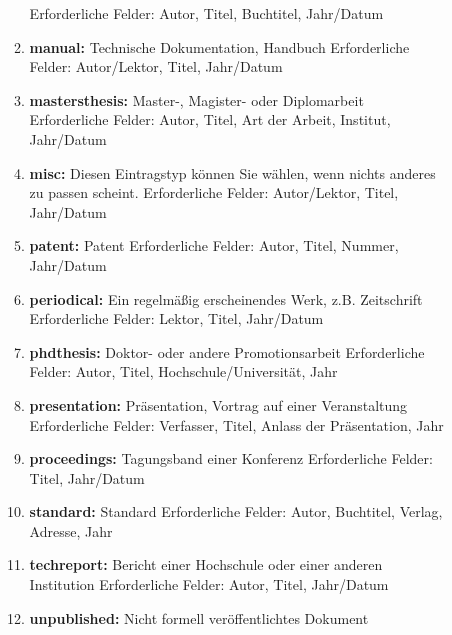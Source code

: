 \begin{description}
\begin{enumerate}
\begin{enumerate}
        Erforderliche Felder: Autor, Titel, Buchtitel, Jahr/Datum
        \item \textbf{manual:} Technische Dokumentation, Handbuch\newline
        Erforderliche Felder: Autor/Lektor, Titel, Jahr/Datum
        \item \textbf{mastersthesis:} Master-, Magister- oder Diplomarbeit\newline
        Erforderliche Felder: Autor, Titel, Art der Arbeit, Institut, Jahr/Datum
        \item \textbf{misc:} Diesen Eintragstyp können Sie wählen, wenn nichts anderes zu passen scheint. \newline
        Erforderliche Felder: Autor/Lektor, Titel, Jahr/Datum
        \item \textbf{patent:} Patent\newline 
        Erforderliche Felder: Autor, Titel, Nummer, Jahr/Datum
        \item \textbf{periodical:} Ein regelmäßig erscheinendes Werk, z.B. Zeitschrift\newline
        Erforderliche Felder: Lektor, Titel, Jahr/Datum
        \item \textbf{phdthesis:} Doktor- oder andere Promotionsarbeit\newline 
        Erforderliche Felder: Autor, Titel, Hochschule/Universität, Jahr 
        \item \textbf{presentation:} Präsentation, Vortrag auf einer Veranstaltung\newline 
        Erforderliche Felder: Verfasser, Titel, Anlass der Präsentation, Jahr
        \item \textbf{proceedings:} Tagungsband einer Konferenz\newline
        Erforderliche Felder: Titel, Jahr/Datum
        \item \textbf{standard:} Standard\newline 
        Erforderliche Felder: Autor, Buchtitel, Verlag, Adresse, Jahr 
        \item \textbf{techreport:} Bericht einer Hochschule oder einer anderen Institution\newline
        Erforderliche Felder: Autor, Titel, Jahr/Datum
        \item \textbf{unpublished:} Nicht formell veröffentlichtes Dokument\newline 

\end{enumerate}
\end{enumerate}
\end{description}
